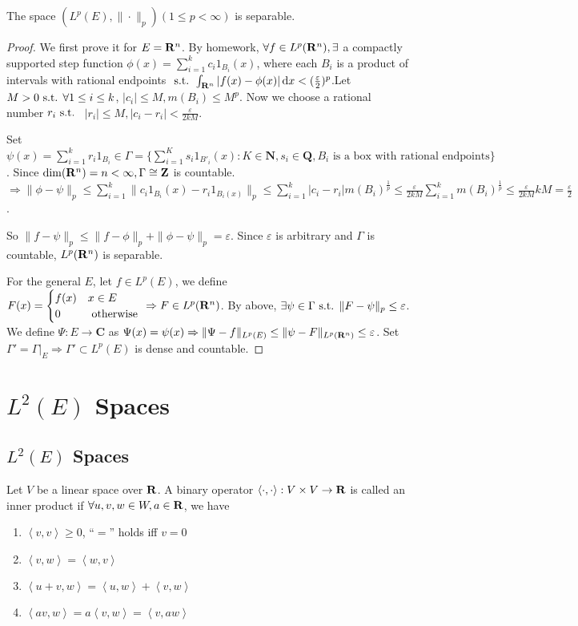 \documentclass{article}
\begin{document}
\begin{Thm}
The space $(L^p(E), \|\cdot\|_p)(1\leq p< \infty)$ is separable. 
\end{Thm}
\begin{proof}
We first prove it for $E=\mathbf{R}^n$. By homework, $\forall f\in L^p(\mathbf{R}^n),\exists$ a compactly supported step function $\phi(x)=\sum\limits_{i=1}^k c_i1_{B_i}(x)$, where  each $B_i$ is a product of intervals with rational endpoints $\text{ s.t. }\int_{\mathbf{R}^n}|f(x)-\phi(x)|\,\mathrm{d} x<(\frac{\varepsilon}{2})^p$.Let $M>0\text{ s.t. } \forall 1\leq i\leq k$, $|c_i|\leq M, m(B_i)\leq M^p$. Now we choose a rational number $r_i\text{ s.t. }$ $|r_i|\leq M, |c_i-r_i|<\frac{\varepsilon}{2kM}$.

Set $\psi(x)=\sum\limits_{i=1}^k r_i1_{B_i}\in \Gamma=\{\sum\limits_{i=1}^K s_i1_{B'_i}(x):{K\in \mathbf{N}}, s_i\in \mathbf{Q}, B_i\text{ is a box with rational endpoints}\}$. Since $\mathrm{dim}(\mathbf{R}^n)=n<\infty,\Gamma\cong\mathbf{Z}$ is countable. $\Rightarrow \|\phi-\psi\|_p\leq \sum\limits_{i=1}^k \|c_i1_{B_i}(x)-r_i1_{B_i(x)}\|_p\leq \sum\limits_{i=1}^k |c_i-r_i|m(B_i)^{\frac 1 p}\leq\frac{\varepsilon}{2kM}\sum\limits_{i=1}^k m(B_i)^{\frac 1 p}\leq \frac{\varepsilon}{2kM}kM=\frac{\varepsilon}{2}$.

So $\|f-\psi\|_p\leq \|f-\phi\|_p+\|\phi-\psi\|_p=\varepsilon$. Since $\varepsilon$ is arbitrary and $\Gamma$ is countable, $L^p(\mathbf{R}^n)$ is separable.

For the general $E$, let $f\in L^p(E)$, we define $F(x)=\begin{cases}f(x)&x\in E\\0&\text{ otherwise }\end{cases}\Rightarrow F\in L^p(\mathbf{R}^n)$. By above, $\exists \psi\in\Gamma\text{ s.t. } \|F-\psi\|_p\leq \varepsilon$. We define $\Psi:E\to\mathbf{C}$ as $\Psi(x)=\psi(x)\Rightarrow \|\Psi-f\|_{L^p(E)}\leq \|\psi-F\|_{L^p(\mathbf{R}^n)}\leq \varepsilon$.
Set $\Gamma'=\left.\Gamma\right|_{E}\Rightarrow \Gamma'\subset L^p(E)$ is dense and countable.
\end{proof}

\section{$L^2(E)$ Spaces}
\subsection{$L^2(E)$ Spaces}
\begin{Def}
Let $V$ be a linear space over $\mathbf{R}$. A binary operator $\left<\cdot,\cdot\right>:V\times V\to \mathbf{R}$ is called an inner product if $\forall u,v,w\in W, a\in \mathbf{R}$, we have
\begin{enumerate}
\item $\left<v,v\right>\geq 0$, ``$=$'' holds iff $v=0$
\item $\left<v,w\right>=\left<w,v\right>$
\item $\left<u+v,w\right>=\left<u,w\right>+\left<v,w\right>$
\item $\left<av,w\right>=a\left<v,w\right>=\left<v,aw\right>$
\end{enumerate}
\end{Def}
\end{document}
